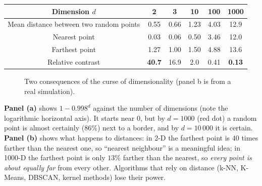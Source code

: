 \begin{center}
\begin{tabular}{@{}c|ccccc@{}}
\toprule
Dimension $d$ & 2 & 3 & 10 & 100 & 1000\\
\midrule
Mean distance between two random points & 0.55 & 0.66 & 1.23 & 4.03 & 12.9\\
Nearest point & 0.03 & 0.06 & 0.50 & 3.46 & 12.0\\
Farthest point & 1.27 & 1.00 & 1.50 & 4.88 & 13.6\\
Relative contrast & \textbf{40.7} & 16.9 & 2.0 & 0.41 & \textbf{0.13}\\
\bottomrule
\end{tabular}
\end{center}

\begin{figure}[!htbp]
\centering
{}
\caption{Two consequences of the curse of dimensionality (panel b is from a real simulation).}\label{fig:curse}
\end{figure}

\begin{explain}
\textbf{Panel (a)} shows $1-0.998^d$ against the number of dimensions (note the logarithmic horizontal axis). It starts near $0$, but by $d=1000$ (red dot) a random point is almost certainly ($86\%$) next to a border, and by $d=10\,000$ it is certain. \textbf{Panel (b)} shows what happens to distances: in 2-D the farthest point is $40$ times farther than the nearest one, so ``nearest neighbour'' is a meaningful idea; in 1000-D the farthest point is only $13\%$ farther than the nearest, so \emph{every point is about equally far} from every other. Algorithms that rely on distance (k-NN, K-Means, DBSCAN, kernel methods) lose their power.
\end{explain}


